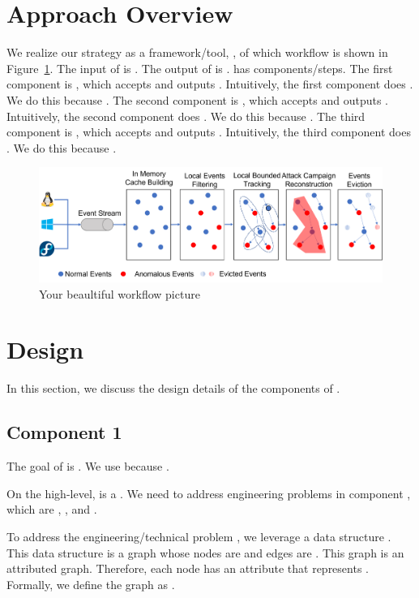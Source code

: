 \section{Approach Overview}
We realize our strategy as a framework/tool, \toolname, of which workflow is shown in Figure~\ref{fig:workflow}. The input of \toolname is \blank{}. The output of \toolname is \blank{}. \toolname has \blank{} components/steps. The first component is \blank{}, which accepts \blank{} and outputs \blank{}. Intuitively, the first component does \blank{}. We do this because \blank{}. The second component is \blank{}, which accepts \blank{} and outputs \blank{}. Intuitively, the second component does \blank{}. We do this because \blank{}. The third component is \blank{}, which accepts \blank{} and outputs \blank{}. Intuitively, the third component does \blank{}. We do this because \blank{}. 

\begin{figure}[t!]
    \centering
    \includegraphics[width=\textwidth]{fig/workflow.png}
	\caption{Your beaultiful workflow picture}
	\label{fig:workflow}
\end{figure}
\section{Design}
In this section, we discuss the design details of the components of \toolname. 
\subsection{Component 1}
The goal of  is \blank{}. We use   because \blank{}. 

On the high-level,  is a . We need to address \blank{} engineering problems in component \blank{}, which are \blank{}, \blank{}, and \blank{}. 

To address the engineering/technical problem \blank{}, we leverage a data structure \blank{}. This data structure is a graph whose nodes are \blank{} and edges are \blank{}. This graph is an attributed graph. Therefore, each node has an attribute that represents \blank{}. Formally, we define the graph as .

